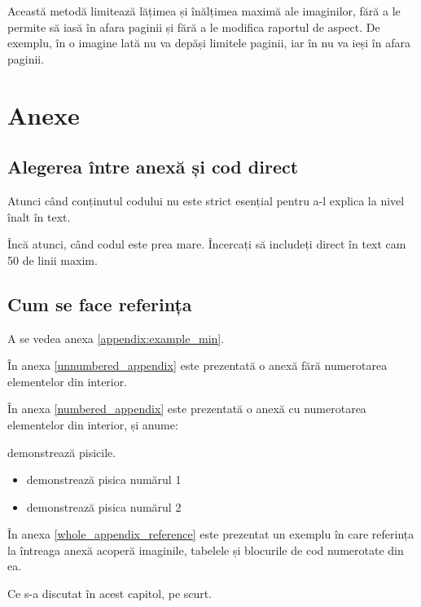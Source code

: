 \documentclass[a4paper,12pt]{report}
\begin{document}
Această metodă limitează lățimea și înălțimea maximă ale imaginilor,
fără a le permite să iasă în afara paginii și fără a le modifica raportul de aspect.
De exemplu, în  o imagine lată nu va depăși limitele paginii,
iar în  nu va ieși în afara paginii.



\section{Anexe}

\subsection{Alegerea între anexă și cod direct}

Atunci când conținutul codului nu este strict esențial 
pentru a-l explica la nivel înalt în text.

Încă atunci, când codul este prea mare. 
Încercați să includeți direct în text cam 50 de linii maxim.

\subsection{Cum se face referința}

A se vedea anexa \ref{appendix:example_min}.

În anexa \ref{unnumbered_appendix} este prezentată o anexă fără numerotarea elementelor din interior.

În anexa \ref{numbered_appendix} este prezentată o anexă cu numerotarea elementelor din interior,
și anume:

 demonstrează pisicile.
\begin{itemize}
  \item {} demonstrează pisica numărul 1
  \item {} demonstrează pisica numărul 2
\end{itemize}

În anexa \ref{whole_appendix_reference} este prezentat un exemplu în care
referința la întreaga anexă acoperă imaginile, tabelele și blocurile de cod numerotate din ea.


Ce s-a discutat în acest capitol, pe scurt.
\end{document}

